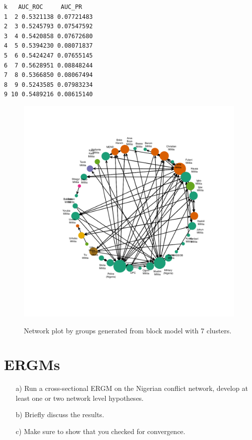 \documentclass[12pt,letterpaper]{article}
\begin{document}
  

\begin{verbatim}
k   AUC_ROC     AUC_PR
1  2 0.5321138 0.07721483
2  3 0.5245793 0.07547592
3  4 0.5420858 0.07672680
4  5 0.5394230 0.08071837
5  6 0.5424247 0.07655145
6  7 0.5628951 0.08848244
7  8 0.5366850 0.08067494
8  9 0.5243585 0.07983234
9 10 0.5489216 0.08615140
\end{verbatim}

  

\begin{figure}[h!]\centering
	\caption{\footnotesize{Network plot by groups generated from block model with 7 clusters.}}\label{fig:figure1}
	\includegraphics[width=.99\textwidth]{figure1.pdf}\\
\end{figure}

\section{ERGMs}

\begin{itemize}
	\item[a)] Run a cross-sectional ERGM on the Nigerian conflict network, develop at least one or two network level hypotheses.
	\item[b)] Briefly discuss the results.
	\item [c)] Make sure to show that you checked for convergence.
\end{itemize}
\end{document}
